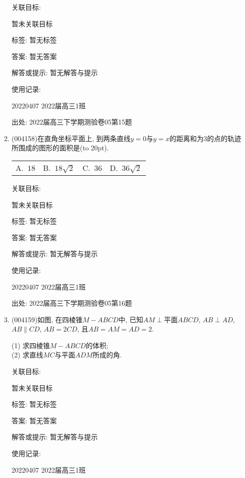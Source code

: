 \documentclass[10pt,a4paper]{article}
\newcommand{\bracket}[1]{(\hbox to #1pt{})}
\newcommand{\fourch}[4]{\par\begin{tabular}{p{.23\textwidth}p{.23\textwidth}p{.23\textwidth}p{.23\textwidth}}
A.~#1 &B.~#2& C.~#3& D.~#4
\end{tabular}}
\begin{document}
\begin{enumerate}[1.]
关联目标:

暂未关联目标



标签: 暂无标签

答案: 暂无答案

解答或提示: 暂无解答与提示

使用记录:

20220407	2022届高三1班	


出处: 2022届高三下学期测验卷05第15题
\item { (004158)}在直角坐标平面上, 到两条直线$y=0$与$y=x$的距离和为$3$的点的轨迹所围成的图形的面积是\bracket{20}.
\fourch{$18$}{$18\sqrt 2$}{$36$}{$36\sqrt 2$}


关联目标:

暂未关联目标



标签: 暂无标签

答案: 暂无答案

解答或提示: 暂无解答与提示

使用记录:

20220407	2022届高三1班	


出处: 2022届高三下学期测验卷05第16题
\item { (004159)}如图, 在四棱锥$M-ABCD$中, 已知$AM\perp\text{平面}ABCD$, $AB\perp AD$, $AB\parallel CD$, $AB=2CD$, 且$AB=AM=AD=2$.
\begin{center}
\end{center}
(1) 求四棱锥$M-ABCD$的体积;\\
(2) 求直线$MC$与平面$ADM$所成的角.


关联目标:

暂未关联目标



标签: 暂无标签

答案: 暂无答案

解答或提示: 暂无解答与提示

使用记录:

20220407	2022届高三1班		



\end{enumerate}
\end{document}
